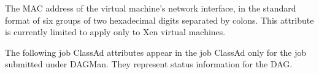 \begin {description}

\item[\AdAttr{VM\_MACAddr}:] The MAC address of the virtual
machine's network interface,
in the standard format of six groups of
two hexadecimal digits separated by colons.
This attribute is currently limited to apply only to Xen virtual machines.






\end{description}

\label{Job-ClassAd-DAGAttributes}
The following job ClassAd attributes appear in the job ClassAd
only for the 
job submitted under DAGMan.
They represent status information for the DAG.

